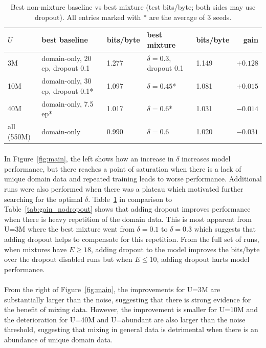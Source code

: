 \documentclass[10pt,a4paper]{article}
\newcommand{\bpb}{bits/byte}
\begin{document}
\begin{table}[h]\centering\small
\begin{tabular}{@{}lllllr@{}}\toprule
$U$ & best baseline & \bpb{} & best mixture & \bpb{} & gain \\\midrule
3M & domain-only, 20 ep, dropout 0.1 & 1.277 & $\delta=0.3$, dropout 0.1 & 1.149 & $+0.128$ \\
10M & domain-only, 30 ep, dropout 0.1* & 1.097 & $\delta=0.45$* & 1.081 & $+0.015$ \\
40M & domain-only, 7.5 ep* & 1.017 & $\delta=0.6$* & 1.031 & $-0.014$ \\
all (550M) & domain-only & 0.990 & $\delta=0.6$ & 1.020 & $-0.031$ \\\bottomrule
\end{tabular}
\caption{Best non-mixture baseline vs best mixture (test \bpb{}; both sides may use dropout). All entries marked with * are the average of 3 seeds.}
\label{tab:gain}
\end{table}

\paragraph{}In Figure~\ref{fig:main}, the left shows how an increase in $\delta$ increases model performance, but there reaches a point of saturation when there is a lack of unique domain data and repeated training leads to worse performance. Additional runs were also performed when there was a plateau which motivated further searching for the optimal $\delta$. 
Table~\ref{tab:gain} in comparison to Table~\ref{tab:gain_nodropout} shows that adding dropout improves performance when there is heavy repetition of the domain data. This is most apparent from U=3M where the best mixture went from $\delta=0.1$ to $\delta = 0.3$ which suggests that adding dropout helps to compensate for this repetition. From the full set of runs, when mixtures have $E\geq18$, adding dropout to the model improves the \bpb{} over the dropout disabled runs but when $E\leq10$, adding dropout hurts model performance. 
\paragraph{} From the right of Figure~\ref{fig:main}, the improvements for U=3M are substantially larger than the noise, suggesting that there is strong evidence for the benefit of mixing data. However, the improvement is smaller for U=10M and the deterioration for U=40M and U=abundant are also larger than the noise threshold, suggesting that mixing in general data is detrimental when there is an abundance of unique domain data.
\end{document}
